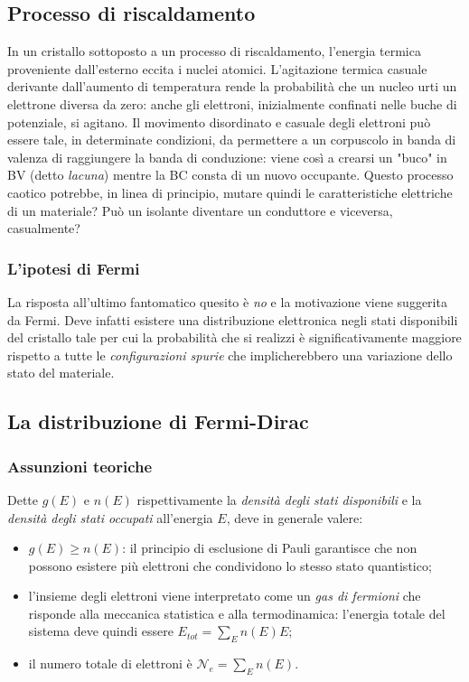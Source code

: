 \documentclass[a4paper,11pt]{report}
\begin{document}
\subsection{Processo di riscaldamento}
In un cristallo sottoposto a un processo di riscaldamento, l'energia termica proveniente dall'esterno eccita i nuclei atomici. L'agitazione termica casuale derivante dall'aumento di temperatura rende la probabilità che un nucleo urti un elettrone diversa da zero: anche gli elettroni, inizialmente confinati nelle buche di potenziale, si agitano. Il movimento disordinato e casuale degli elettroni può essere tale, in determinate condizioni, da permettere a un corpuscolo in banda di valenza di raggiungere la banda di conduzione: viene così a crearsi un "buco" in BV (detto \textit{lacuna}) mentre la BC consta di un nuovo occupante. Questo processo caotico potrebbe, in linea di principio, mutare quindi le caratteristiche elettriche di un materiale? Può un isolante diventare un conduttore e viceversa, casualmente? 

\subsubsection{L'ipotesi di Fermi}
La risposta all'ultimo fantomatico quesito è \textit{no} e la motivazione viene suggerita da Fermi. Deve infatti esistere una distribuzione elettronica negli stati disponibili del cristallo tale per cui la probabilità che si realizzi è significativamente maggiore rispetto a tutte le \textit{configurazioni spurie} che implicherebbero una variazione dello stato del materiale. 

\subsection{La distribuzione di Fermi-Dirac}
\subsubsection{Assunzioni teoriche}
Dette $g(E)$ e $n(E)$ rispettivamente la \textit{densità degli stati disponibili} e la \textit{densità degli stati occupati} all'energia $E$, deve in generale valere:
\begin{itemize}
\item $g(E) \geq n(E)$: il principio di esclusione di Pauli garantisce che non possono esistere più elettroni che condividono lo stesso stato quantistico;
\item l'insieme degli elettroni viene interpretato come un \textit{gas di fermioni} che risponde alla meccanica statistica e alla termodinamica: l'energia totale del sistema deve quindi essere $E_{tot} = \sum_E n(E) E$;
\item il numero totale di elettroni è $\mathcal{N}_e = \sum_E n(E)$.
\end{itemize}
\end{document}
